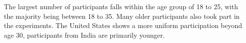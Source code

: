 \documentclass[10pt]{article}\usepackage[]{graphicx}\usepackage[]{xcolor}
\begin{document}
%   
% 




The largest number of participants falls within the age group of 18 to 25, with the majority being between 18 to 35. Many older participants also took part in the experiments. %
The United States shows a more uniform participation beyond age 30,  participants from India are primarily younger. 
\end{document}
